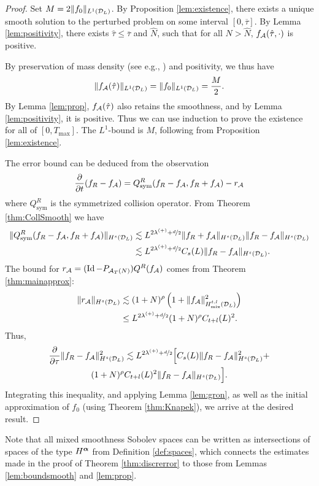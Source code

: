 \begin{proof}
    Set $M=2\|f_0\|_{L^1(\mathcal{D}_L)}$. By Proposition \ref{lem:existence}, there
    exists a unique smooth solution to the perturbed problem on some interval
    $[0,\overline{\tau}]$. By Lemma \ref{lem:positivity}, there exists
    $\hat{\tau}\leq\overline{\tau}$ and $\hat{N}$, such that for all
    $N>\hat{N}$, $f_{\mathcal{A}}(\hat{\tau},\cdot)$ is positive.

      By preservation of mass density
      (see e.g., \cite[Equation (3.4)]{Filbet2011asm}) and positivity, we thus have
    $$
        \|f_{\mathcal{A}}(\hat{\tau})\|_{L^1(\mathcal{D}_L)} = \|f_0\|_{L^1(\mathcal{D}_L)} =
        \frac{M}{2}.
    $$
    By Lemma \ref{lem:prop}, $f_{\mathcal{A}}(\hat{\tau})$ also retains the smoothness,
    and by Lemma \ref{lem:positivity}, it is positive. Thus we can use
    induction to prove the existence for all of $[0,T_\mathrm{max}]$. The
    $L^1$-bound is $M$, following from Proposition \ref{lem:existence}.

    The error bound can be deduced from the observation
    $$
        \frac{\partial}{\partial t}(f_R-f_{\mathcal{A}}) = 
        Q^R_{\mathrm{sym}}(f_R-f_{\mathcal{A}},f_R+f_{\mathcal{A}}) - r_{\mathcal{A}}
    $$
    where $Q^R_{\mathrm{sym}}$ is the symmetrized collision operator. From
    Theorem \ref{thm:CollSmooth} we have
    \begin{align*}
        \|Q^R_{\mathrm{sym}}(f_R-f_{\mathcal{A}},f_R+f_{\mathcal{A}})\|_{H^s(\mathcal{D}_L)} & \lesssim
        L^{2\lambda^{(+)}+\nicefrac{d}{2}}\|f_R+f_{\mathcal{A}}\|_{H^s(\mathcal{D}_L)}\|f_R-f_{\mathcal{A}}\|_{H^s(\mathcal{D}_L)} \\ 
        & \lesssim L^{2\lambda^{(+)}+\nicefrac{d}{2}}C_s(L)\|f_R-f_{\mathcal{A}}\|_{H^s(\mathcal{D}_L)}.
    \end{align*}
    The bound for $r_{\mathcal{A}}=(\operatorname{Id}-P_{\mathcal{A}_T(N)})Q^R(f_{\mathcal{A}})$ comes from Theorem
    \ref{thm:mainapprox}:
    \begin{align*}
        \|r_{\mathcal{A}}\|_{H^s(\mathcal{D}_L)} & \lesssim (1+N)^{\rho}
        \left(1+\|f_{\mathcal{A}}\|_{{H}^{t,l}_\mathrm{mix}(\mathcal{D}_L)}^2\right)
        \\ &\leq L^{2\lambda^{(+)}+\nicefrac{d}{2}}(1+N)^{\rho}C_{t+l}(L)^2.
    \end{align*}
    Thus,
    \begin{multline*}
        \frac{\partial}{\partial\tau} \|f_R-f_{\mathcal{A}}\|^2_{H^s(\mathcal{D}_L)} \lesssim
        L^{2\lambda^{(+)}+\nicefrac{d}{2}} \Big[ C_s(L)\|f_R-f_{\mathcal{A}}\|^2_{H^s(\mathcal{D}_L)} + \\
        (1+N)^{\rho}C_{t+l}(L)^2\|f_R-f_{\mathcal{A}}\|_{H^s(\mathcal{D}_L)} \Big] .
    \end{multline*}
    Integrating this inequality, and applying Lemma \ref{lem:gron}, as well as
    the initial approximation of $f_0$ (using Theorem \ref{thm:Knapek}), we
    arrive at the desired result.
\end{proof}
Note that all mixed smoothness Sobolev spaces can be written as intersections of spaces of the type
$H^{{\bm\alpha}}$ from Definition \ref{def:spaces}, which connects the estimates made in the proof of Theorem
\ref{thm:discrerror} to those from Lemmas \ref{lem:boundsmooth} and \ref{lem:prop}.


